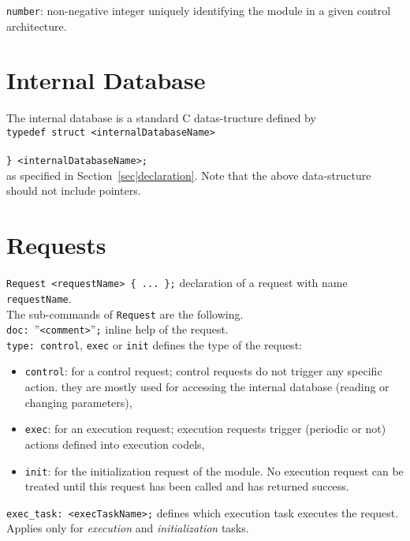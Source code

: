 \noindent
{\tt number}: non-negative integer uniquely identifying the module in
a given control architecture.\\

\section{Internal Database}
\label{sec|database}
The internal database is a standard C datas-tructure defined by\\
{\tt typedef struct <internalDatabaseName>}\\
\\
{\tt \} <internalDatabaseName>; }\\ 
as specified in Section~\ref{sec|declaration}. Note that the above
data-structure should not include pointers.

\section{Requests}
\label{sec|requests}

{\tt Request <requestName> \{ ... \};} declaration of a request with
name {\tt requestName}.\\

\noindent
The sub-commands of {\tt Request} are the following.\\
\noindent
{\tt doc: }''{\tt<comment>}''{\tt;} inline help of the request.\\

\noindent
{\tt type:  control}, {\tt exec} or {\tt init} defines the type of the request:\\
\begin{itemize}
\item {\tt control}: for a control request; control requests do not
  trigger any specific action. they are mostly used for accessing the
  internal database (reading or changing parameters),
\item {\tt exec}: for an execution request; execution requests trigger
  (periodic or not) actions defined into execution codels,
\item {\tt init}: for the initialization request of the module. No
  execution request can be treated until this request has been
  called and has returned success.
\end{itemize}

\noindent 
{\tt exec\_task:  <execTaskName>;} defines which execution task
executes the request. Applies only for {\em execution} and {\em
  initialization} tasks.\\


